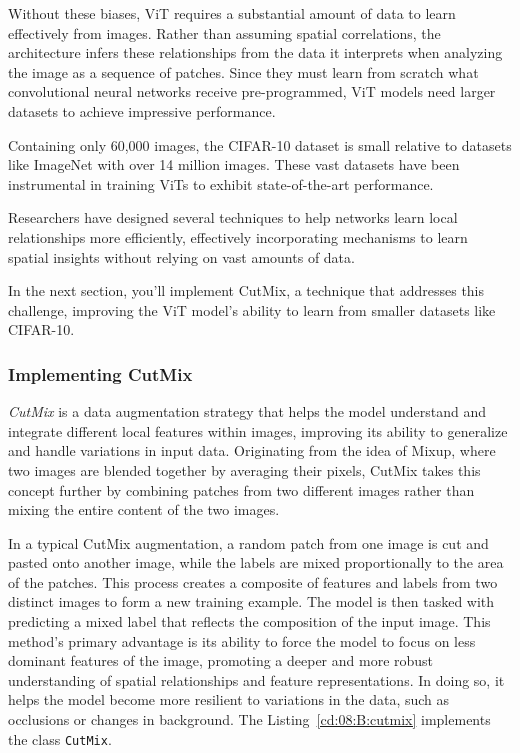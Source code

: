 Without these biases, ViT requires a substantial amount of data to learn effectively from images. Rather than assuming spatial correlations, the architecture infers these relationships from the data it interprets when analyzing the image as a sequence of patches. Since they must learn from scratch what convolutional neural networks receive pre-programmed, ViT models need larger datasets to achieve impressive performance.

Containing only 60,000 images, the CIFAR-10 dataset is small relative to  datasets like ImageNet with over 14 million images. These vast datasets have been instrumental in training ViTs to exhibit state-of-the-art performance.

Researchers have designed several techniques to help networks learn local relationships more efficiently, effectively incorporating mechanisms to learn spatial insights without relying on vast amounts of data. 

In the next section, you'll implement CutMix, a technique that addresses this challenge, improving the ViT model's ability to learn from smaller datasets like CIFAR-10.

\subsubsection{Implementing CutMix}

\emph{CutMix} is a data augmentation strategy that helps the model understand and integrate different local features within images, improving its ability to generalize and handle variations in input data. Originating from the idea of Mixup, where two images are blended together by averaging their pixels, CutMix takes this concept further by combining patches from two different images rather than mixing the entire content of the two images. 


In a typical CutMix augmentation, a random patch from one image is cut and pasted onto another image, while the labels are mixed proportionally to the area of the patches. This process creates  a composite of features and labels from two distinct images to form a new training example. The model is then tasked with predicting a mixed label that reflects the composition of the input image. This method's primary advantage is its ability to force the model to focus on less dominant features of the image, promoting a deeper and more robust understanding of spatial relationships and feature representations. In doing so, it helps the model become more resilient to variations in the data, such as occlusions or changes in background. The Listing~\ref{cd:08:B:cutmix} implements the class \lstinline{CutMix}.

